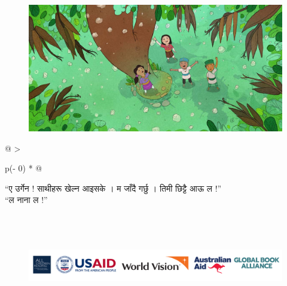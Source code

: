 \documentclass[
  letterpaper,
  DIV=11,
  numbers=noendperiod,
  paper=6in:9in,
  pagesize=pdftex,
  headinclude=on,
  footinclude=on,
  12pt]{scrreprt}
\begin{document}
\begin{figure}[H]

{\centering \includegraphics{images/p-8.jpg}

}

\end{figure}

\begin{longtable}[]{@{}
  >{\raggedright\arraybackslash}p{(\columnwidth - 0\tabcolsep) * }@{}}
\toprule\noalign{}
\endhead
\bottomrule\noalign{}
\endlastfoot
\begin{minipage}[t]{\linewidth}\raggedright
``ए उर्गेन ! साथीहरू खेल्न आइसके । म जाँदै गर्छु । तिमी छिट्टै आऊ ल !''\\
``ल नाना ल !''\strut
\end{minipage} \\
\end{longtable}


\hypertarget{section-7}{%
\chapter{}\label{section-7}}

\begin{figure}[H]

{\centering \includegraphics{images/p-9.jpg}

}

\end{figure}
\end{document}

